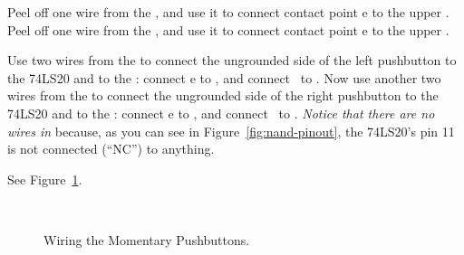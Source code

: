 Peel off one wire from the \rainbow, and use it to connect contact point e to the upper \ground.
Peel off one wire from the \rainbow, and use it to connect contact point e to the upper \ground.

Use two wires from the \rainbow to connect the ungrounded side of the left pushbutton to the 74LS20 and to the \developmentboard:
connect e to \leftbuttontarget, and connect \mculeftbuttonfrom\ to \mculeftbuttonpoint.
Now use another two wires from the \rainbow to connect the ungrounded side of the right pushbutton to the 74LS20 and to the \developmentboard:
connect e to \rightbuttontarget, and connect \mcurightbuttonfrom\ to \mcurightbuttonpoint.
\textit{Notice that there are no wires in \nanduppernc} because, as you can see in Figure~\ref{fig:nand-pinout}, the 74LS20's pin 11 is not connected (``NC'') to anything.

See Figure~\ref{fig:pushbutton-wired}.

\begin{figure}%
    \centering
    \hfil
    \\
    \caption{Wiring the Momentary Pushbuttons.
        \label{fig:pushbutton-wired}}
\end{figure}

